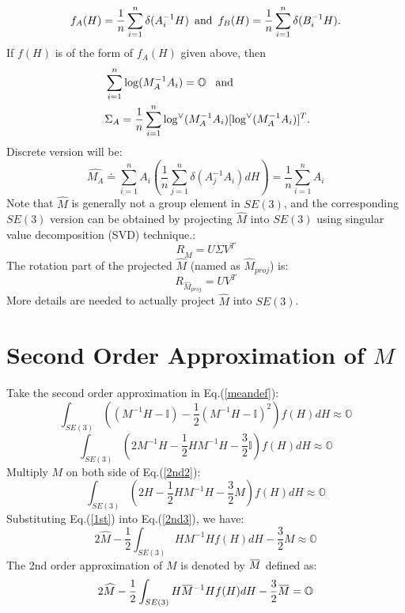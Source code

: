 \documentclass[twocolumn,10pt]{asme2ej}
\newcommand{\II}{\mathbb{I}}
\newcommand{\overbar}[1]{\mkern 1.5mu\overline{\mkern-1.5mu#1\mkern-1.5mu}\mkern 1.5mu}
\begin{document}
 $$ f_A(H) = \frac{1}{n} \sum_{i=1}^{n} \delta(A_i^{-1} H) \,\,\, {\rm and} \,\,\, f_B(H) = \frac{1}{n} \sum_{i=1}^{n} \delta(B_i^{-1} H). $$
 If $f(H)$ is of the form of $f_A(H)$ given above, then
\begin{equation} \
\begin{split} &\sum_{i=1}^{n} \log(M_A^{-1} A_i) = \mathbb{O} {\rm \,\,\,\,\, and} \\
&\Sigma_A = \frac{1}{n} \sum_{i=1}^{n} \log^{\vee}(M_A^{-1} A_i) [\log^{\vee}(M_A^{-1} A_i)]^T.  \label{datameancovconvdef} \end{split}
\end{equation}
Discrete version will be:
\begin{equation}
\widehat{M_{A}} \doteq \sum_{i=1}^{n} A_{i} \left( \frac{1}{n} \sum_{j=1}^{n}  \delta(A_j^{-1} A_{i})dH \right) = \dfrac{1}{n}\sum_{i=1}^{n}A_{i}
\end{equation}
Note that $\widehat{M}$ is generally not a group element in $SE(3)$, and the corresponding $SE(3)$ version can be obtained by projecting $\widehat{M}$ into $SE(3)$ using singular value decomposition (SVD) technique.:
\begin{equation}
R_{\widehat{M}} = U \Sigma V^{T}
\label{proj}
\end{equation}
The rotation part of the projected $\widehat{M}$ (named as $\widehat{M}_{proj}$) is:
\begin{equation}
R_{\widehat{M}_{proj}} = UV^{T}
\end{equation}
More details are needed to actually project $\widehat{M}$ into $SE(3)$.

\section{Second Order Approximation of $M$}
Take the second order approximation in Eq.(\ref{meandef}):
\begin{equation}
\int_{SE(3)} \left((M^{-1}H - \II) - \dfrac{1}{2}(M^{-1}H - \II)^2 \right)f(H)dH \approx \mathbb{O}
\label{2nd1}
\end{equation}
\begin{equation}
\int_{SE(3)} \left( 2M^{-1}H - \dfrac{1}{2}HM^{-1}H - \dfrac{3}{2} \II \right)f(H)dH \approx \mathbb{O}
\label{2nd2}
\end{equation}
Multiply $M$ on both side of Eq.(\ref{2nd2}):
\begin{equation}
\int_{SE(3)} \left( 2H - \dfrac{1}{2}HM^{-1}H -\dfrac{3}{2}M \right)f(H)dH \approx \mathbb{O}
\label{2nd3}
\end{equation}
Substituting Eq.(\ref{1st}) into Eq.(\ref{2nd3}), we have:
\begin{equation}
2\widehat{M} - \dfrac{1}{2}\int_{SE(3)}HM^{-1}Hf(H)dH - \dfrac{3}{2}M \approx \mathbb{O}
\end{equation}
The 2nd order approximation of $M$ is denoted by $\overbar{M}$ defined as:
\begin{equation}
2\widehat{M} - \dfrac{1}{2}\int_{SE(3)}H\overbar{M}^{-1}Hf(H)dH - \dfrac{3}{2}\overbar{M} = \mathbb{O}
\end{equation}
\end{document}
